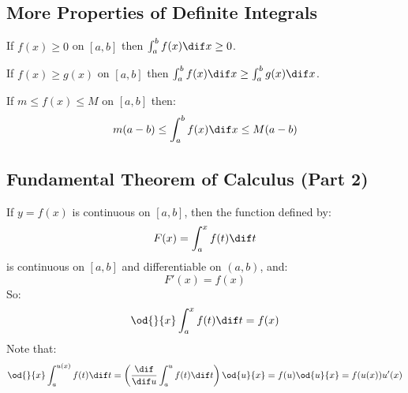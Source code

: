 \subsection{More Properties of Definite Integrals}
	If $f(x) \geq 0$ on $[a,b]$ then $\int_a^b f(x) \dif x \geq 0$.

	If $f(x) \geq g(x)$ on $[a,b]$ then $\int_a^b f(x) \dif x \geq \int_a^b g(x) \dif x$.

	If $m \leq f(x) \leq M$ on $[a,b]$ then:
	\[m(a-b) \leq \int_a^b f(x) \dif x \leq M(a-b)\]
\subsection{Fundamental Theorem of Calculus (Part 2)}
	If $y=f(x)$ is continuous on $[a,b]$, then the function defined by:
	\[F(x) = \int_a^x f(t) \dif t\]
	is continuous on $[a,b]$ and differentiable on $(a,b)$, and:
	\[F'(x) = f(x)\]
	So:
	\[\od{}{x} \int_a^x f(t) \dif t = f(x)\]
	Note that:
	\[\od{}{x} \int_a^{u(x)} f(t) \dif t = \left( \frac{\dif}{\dif u} \int_a^u f(t) \dif t \right) \od{u}{x} = f(u) \od{u}{x} = f(u(x))u'(x)\]
